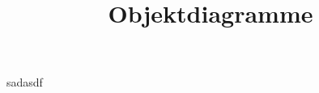 \documentclass[a4paper]{scrartcl}
\date{}
\title{Objektdiagramme}
\begin{document}
 sadasdf

\begin{plantuml}
\end{plantuml}
\end{document}
